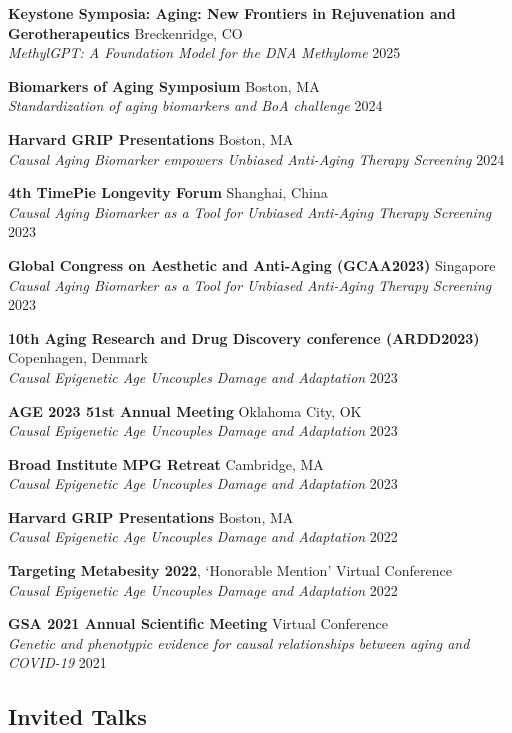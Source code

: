 \documentclass[
  11pt,
]
{article}
\begin{document}
\textbf{Keystone Symposia: Aging: New Frontiers in Rejuvenation and
Gerotherapeutics} \hfill Breckenridge, CO\\
\emph{MethylGPT: A Foundation Model for the DNA Methylome} \hfill 2025

\textbf{Biomarkers of Aging Symposium} \hfill Boston, MA\\
\emph{Standardization of aging biomarkers and BoA challenge} \hfill 2024

\textbf{Harvard GRIP Presentations} \hfill Boston, MA\\
\emph{Causal Aging Biomarker empowers Unbiased Anti-Aging Therapy
Screening} \hfill 2024

\textbf{4th TimePie Longevity Forum} \hfill Shanghai, China\\
\emph{Causal Aging Biomarker as a Tool for Unbiased Anti-Aging Therapy
Screening} \hfill 2023

\textbf{Global Congress on Aesthetic and Anti-Aging (GCAA2023)}
\hfill Singapore\\
\emph{Causal Aging Biomarker as a Tool for Unbiased Anti-Aging Therapy
Screening} \hfill 2023

\textbf{10th Aging Research and Drug Discovery conference (ARDD2023)}
\hfill Copenhagen, Denmark\\
\emph{Causal Epigenetic Age Uncouples Damage and Adaptation} \hfill 2023

\textbf{AGE 2023 51st Annual Meeting} \hfill Oklahoma City, OK\\
\emph{Causal Epigenetic Age Uncouples Damage and Adaptation} \hfill 2023

\textbf{Broad Institute MPG Retreat} \hfill Cambridge, MA\\
\emph{Causal Epigenetic Age Uncouples Damage and Adaptation} \hfill 2023

\textbf{Harvard GRIP Presentations} \hfill Boston, MA\\
\emph{Causal Epigenetic Age Uncouples Damage and Adaptation} \hfill 2022

\textbf{Targeting Metabesity 2022}, `Honorable Mention' \hfill Virtual
Conference\\
\emph{Causal Epigenetic Age Uncouples Damage and Adaptation} \hfill 2022

\textbf{GSA 2021 Annual Scientific Meeting} \hfill Virtual Conference\\
\emph{Genetic and phenotypic evidence for causal relationships between
aging and COVID-19} \hfill 2021

\subsection{Invited Talks}\label{invited-talks}
\end{document}

